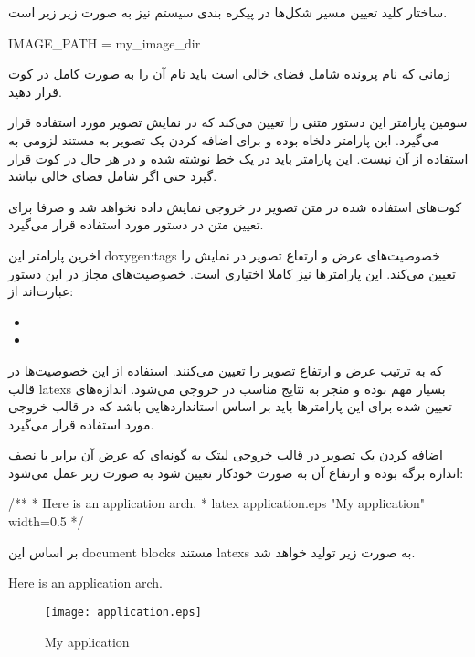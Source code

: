ساختار کلید تعیین مسیر شکل‌ها در پیکره بندی سیستم نیز به صورت زیر زیر است.

\begin{doxygen}
IMAGE_PATH = my_image_dir
\end{doxygen}

\begin{note}
زمانی که نام پرونده شامل فضای خالی است باید نام آن را به صورت کامل در کوت
قرار دهید.
\end{note}

سومین پارامتر این دستور متنی را تعیین می‌کند که در نمایش تصویر مورد
استفاده قرار می‌گیرد. این پارامتر دلخاه بوده و برای اضافه کردن یک تصویر به مستند
لزومی به استفاده از آن نیست. این پارامتر باید در یک خط نوشته شده و در هر حال در
کوت قرار گیرد حتی اگر شامل فضای خالی نباشد.

\begin{note}
کوت‌های استفاده شده در متن تصویر در خروجی نمایش داده نخواهد شد و صرفا برای
تعیین متن در دستور مورد استفاده قرار می‌گیرد.
\end{note}

اخرین پارامتر این \glspl{doxygen:tag} خصوصیت‌های عرض و ارتفاع تصویر در نمایش را
تعیین می‌کند. این پارامترها نیز کاملا اختیاری است. خصوصیت‌های مجاز در این دستور
عبارت‌اند از:

\begin{itemize}
  \item {}
  \item {}
\end{itemize}

که به ترتیب عرض و ارتفاع تصویر را تعیین می‌کنند. استفاده از این خصوصیت‌ها در
قالب \glspl{latex} بسیار مهم بوده و منجر به نتایج مناسب در خروجی می‌شود.
اندازه‌های تعیین شده برای این پارامترها باید بر اساس استانداردهایی باشد که در قالب خروجی مورد
استفاده قرار می‌گیرد.

اضافه کردن یک تصویر در قالب خروجی لیتک به گونه‌ای که عرض آن برابر با نصف اندازه
برگه بوده و ارتفاع آن به صورت خودکار تعیین شود به صورت زیر عمل می‌شود:

\begin{Java}
/**
 * Here is an application arch. 
 *  \image latex application.eps "My application" width=0.5\textwidth
 */
\end{Java}

بر اساس این \glspl{document block} مستند \glspl{latex} به صورت زیر تولید خواهد
شد.

\begin{latex}
Here is an application arch.

\begin{figure}
\texttt{[image: application.eps]}
\caption{My application}
\end{figure}
\end{latex}

